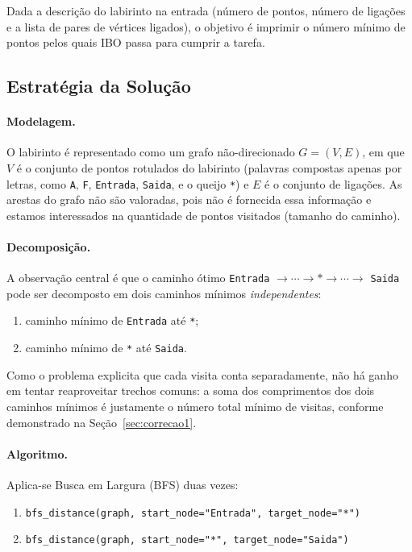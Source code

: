 \documentclass[11pt,a4paper]{article}
\begin{document}
Dada a descrição do labirinto na entrada (número de pontos, número de
ligações e a lista de pares de vértices ligados), o objetivo é imprimir
o número mínimo de pontos pelos quais IBO passa para cumprir a tarefa.

\subsection{Estratégia da Solução}

\paragraph{Modelagem.} O labirinto é representado como um grafo
não-direcionado $G=(V,E)$, em que $V$ é o conjunto de pontos rotulados
do labirinto (palavras compostas apenas por letras, como \texttt{A},
\texttt{F}, \texttt{Entrada}, \texttt{Saida}, e o queijo \texttt{*})
e $E$ é o conjunto de ligações. As arestas do grafo não são valoradas, pois não é fornecida essa informação e estamos interessados na quantidade de pontos visitados (tamanho do caminho).

\paragraph{Decomposição.} A observação central é que o caminho ótimo
\texttt{Entrada} $\to \cdots \to *\to \cdots \to$ \texttt{Saida} pode
ser decomposto em dois caminhos mínimos \emph{independentes}:

\begin{enumerate}[label=(\alph*)]
    \item caminho mínimo de \texttt{Entrada} até \texttt{*};
    \item caminho mínimo de \texttt{*} até \texttt{Saida}.
\end{enumerate}

Como o problema explicita que cada visita conta separadamente, não há
ganho em tentar reaproveitar trechos comuns: a soma dos comprimentos
dos dois caminhos mínimos é justamente o número total mínimo de
visitas, conforme demonstrado na Seção~\ref{sec:correcao1}.

\paragraph{Algoritmo.} Aplica-se Busca em Largura (BFS) duas vezes:

\begin{enumerate}
    \item \texttt{bfs\_distance(graph, start\_node="Entrada", target\_node="*")}
    \item \texttt{bfs\_distance(graph, start\_node="*", target\_node="Saida")}
\end{enumerate}
\end{document}
